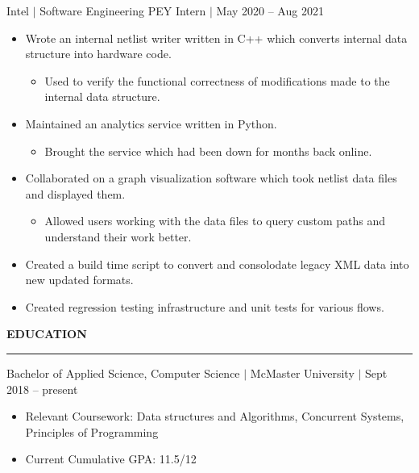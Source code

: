 \documentclass[12pt]{article}
\newcommand{\sectionRule}{\textcolor{gray}{\rule{7.27in}{0.02cm}}}
\newcommand{\sectionTxt}[1]{\noindent\textbf{#1}\\}
\newcommand{\textDate}[3]{\noindent#1 $|$ #2 $|$ {\color{textGray} #3}}
\begin{document}
    \textDate{Intel}{Software Engineering PEY Intern}{May 2020 -- Aug 2021}
    \begin{small}
        \begin{itemize}
            \itemsep0em 
            \item {\color{textGray} Wrote an internal netlist writer written in C++ which converts internal data structure into hardware code.}
                \begin{itemize}[label=$\circ$,topsep=-5px,partopsep=0px]
                    \itemsep0em 
                    \item {\color{textGray} Used to verify the functional correctness of modifications made to the internal data structure.}
                \end{itemize}
            \item {\color{textGray} Maintained an analytics service written in Python.}
                \begin{itemize}[label=$\circ$,topsep=-5px,partopsep=0px]
                    \itemsep0em 
                    \item {\color{textGray} Brought the service which had been down for months back online.}
                \end{itemize}
            \item {\color{textGray} Collaborated on a graph visualization software which took netlist data files and displayed them.}
                \begin{itemize}[label=$\circ$,topsep=-5px,partopsep=0px]
                    \itemsep0em 
                    \item {\color{textGray} Allowed users working with the data files to query custom paths and understand their work better.}
                \end{itemize}
            \item {\color{textGray} Created a build time script to convert and consolodate legacy XML data into new updated formats.}
            \item {\color{textGray} Created regression testing infrastructure and unit tests for various flows.}
        \end{itemize}
    \end{small}

    \sectionTxt{EDUCATION}
    \sectionRule

    \textDate{Bachelor of Applied Science, Computer Science}{McMaster University}{Sept 2018 -- present}
    \begin{small}
        \begin{itemize}
            \itemsep0em 
            \item Relevant Coursework: {\color{textGray} Data structures and Algorithms, Concurrent Systems, Principles of Programming}
            \item Current Cumulative GPA: {\color{textGray} 11.5/12}
        \end{itemize}
    \end{small}
\end{document}
